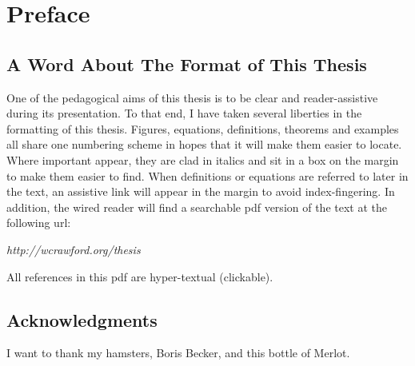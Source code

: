 \chapter*{Preface}
\section*{A Word About The Format of This Thesis}
One of the pedagogical aims of this thesis is to be clear and reader-assistive during its presentation.  To that end, I have taken several liberties in the formatting of this thesis.  Figures, equations, definitions, theorems and examples all share one numbering scheme in hopes that it will make them easier to locate. Where important  appear, they are clad in italics and sit in a box on the margin to make them easier to find.  When definitions or equations are referred to later in the text, an assistive link will appear in the margin to avoid index-fingering.  In addition, the wired reader will find a searchable pdf version of the text at the following url:
\begin{center}
	\emph{http://wcrawford.org/thesis}
\end{center}
All references in this pdf are hyper-textual (clickable).

\section*{Acknowledgments}
I want to thank my hamsters, Boris Becker, and this bottle of Merlot.
